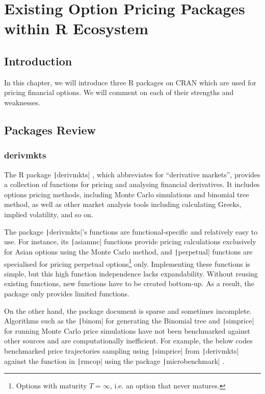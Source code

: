 \chapter{Existing Option Pricing Packages within R Ecosystem} \label{cpt:Existing Packages}

\section{Introduction}

In this chapter, we will introduce three R packages on CRAN which are used for pricing financial options. We will comment on each of their strengths and weaknesses.

\section{Packages Review}

\subsection{derivmkts} \label{sub:derivmkts}

The R package \texttt|derivmkts| \cite{McDonald2022}, which abbreviates for ``derivative markets'', provides a collection of functions for pricing and analysing financial derivatives. It includes options pricing methods, including Monte Carlo simulations and binomial tree method, as well as other market analysis tools including calculating Greeks, implied volatility, and so on.

The package \texttt|derivmkts|'s functions are functional-specific and relatively easy to use. For instance, its \texttt|asianmc| functions provide pricing calculations exclusively for Asian options using the Monte Carlo method, and \texttt|perpetual| functions are specialised for pricing perpetual options\footnote{Options with maturity $T=\infty$, i.e. an option that never matures.} only. Implementing these functions is simple, but this high function independence lacks expandability. Without reusing existing functions, new functions have to be created bottom-up. As a result, the package only provides limited functions.

On the other hand, the package document is sparse and sometimes incomplete. Algorithms such as the \texttt|binom| for generating the Binomial tree and \texttt|simprice| for running Monte Carlo price simulations have not been benchmarked against other sources and are computationally inefficient. For example, the below codes benchmarked price trajectories sampling using \texttt|simprice| from \texttt|derivmkts| against the function in \texttt|rmcop| using the package \texttt|microbenchmark| \cite{Mersmann2022}.

